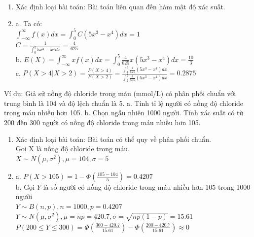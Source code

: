 \documentclass[12pt]{article}
\begin{document}
\begin{enumerate}
    \item Xác định loại bài toán: Bài toán liên quan đến hàm mật độ xác suất.
    \item a. Ta có: \\
    $\int_{-\infty}^{\infty} f(x)dx = \int_{0}^{5} C(5x^3-x^4) dx = 1$ \\
    $C = \frac{1}{\int_{0}^{5} 5x^3-x^4 dx} = \frac{4}{625}$ \\
    b. $E(X) = \int_{-\infty}^{\infty} xf(x)dx = \int_{0}^{5} \frac{4}{625}x(5x^3-x^4) dx = \frac{10}{3}$ \\
    c. $P(X > 4 | X > 2) = \frac{P(X > 4)}{P(X > 2)} = \frac{\int_{4}^{5} \frac{4}{625}(5x^3-x^4) dx}{\int_{2}^{5} \frac{4}{625}(5x^3-x^4) dx} = 0.2875$
\end{enumerate}
Ví dụ: Giả sử nồng độ chloride trong máu (mmol/L) có phân phối
chuẩn với trung bình là 104 và độ lệch chuẩn là 5.
a. Tính tỉ lệ người có nồng độ chloride trong máu nhiều hơn 105.
b. Chọn ngẫu nhiên 1000 người. Tính xác suất có từ 200 đến 300 người có nồng
độ chloride trong máu nhiều hơn 105.
\begin{enumerate}
    \item Xác định loại bài toán: Bài toán có thể quy về phân phối chuẩn. \\
    Gọi X là nồng độ chloride trong máu. \\
    $X \sim N(\mu, \sigma^2), \mu = 104, \sigma = 5$
    \item a. $P(X > 105) = 1 - \Phi(\frac{105-104}{5}) = 0.4207$ \\
    b. Gọi $Y$ là số người có nồng độ chloride trong máu nhiều hơn 105 trong 1000 người \\
    $Y \sim B(n, p), n = 1000, p = 0.4207$ \\
    $Y \sim N(\mu, \sigma^2), \mu = np = 420.7, \sigma = \sqrt{np(1-p)} = 15.61$ \\
    $P(200 \leq Y \leq 300) = \Phi(\frac{300-420.7}{15.61}) - \Phi(\frac{200-420.7}{15.61}) \approx 0$
\end{enumerate}
\end{document}
